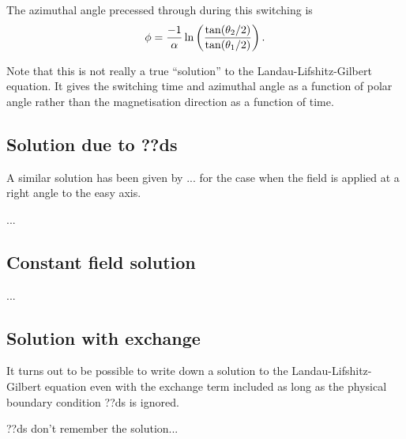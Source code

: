 The azimuthal angle precessed through during this switching is
\begin{equation}
  \phi = \frac{-1}{\alpha} \ln \left( \frac{\tan(\theta_2/2)}{\tan(\theta_1/2)} \right).
\end{equation}

Note that this is not really a true ``solution'' to the Landau-Lifshitz-Gilbert equation.
It gives the switching time and azimuthal angle as a function of polar angle rather than the magnetisation direction as a function of time.

\subsection{Solution due to ??ds}

A similar solution has been given by ... for the case when the field is applied at a right angle to the easy axis.


...



\subsection{Constant field solution}

...


\subsection{Solution with exchange}

It turns out to be possible to write down a solution to the Landau-Lifshitz-Gilbert equation even with the exchange term included as long as the physical boundary condition ??ds is ignored.

??ds don't remember the solution...
